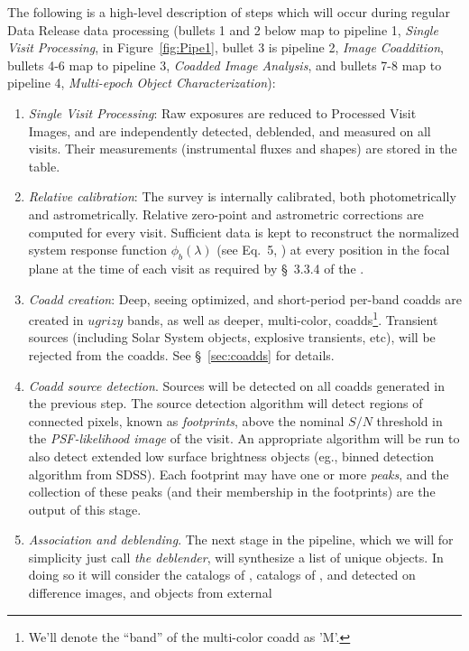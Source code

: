 The following is a high-level description of steps which will occur during regular Data Release data processing
(bullets 1 and 2 below map to pipeline 1, \emph{Single Visit Processing}, in Figure~\ref{fig:Pipe1}, bullet 3 is
pipeline 2, \emph{Image Coaddition}, bullets 4-6 map to pipeline 3, \emph{Coadded Image Analysis}, and
bullets 7-8 map to pipeline 4, \emph{Multi-epoch Object Characterization}):
\begin{enumerate}
    \item \emph{Single Visit Processing}: Raw exposures are reduced to Processed Visit Images, and \Sources are independently detected, deblended, and measured on all visits. Their measurements (instrumental fluxes and shapes) are stored in the \Source table.
    \item \emph{Relative calibration}: The survey is internally calibrated, both photometrically and astrometrically. Relative zero-point and astrometric corrections are computed for every visit.  Sufficient data is kept to reconstruct the normalized system response function $\phi_b(\lambda)$ (see Eq.~5, \SRD) at every position in the focal plane at the time of each visit as required by \S~3.3.4 of the \SRD.
    \item \emph{Coadd creation}: Deep, seeing optimized,  and short-period per-band coadds are created in $ugrizy$ bands, as well as deeper, multi-color,  coadds\footnote{We'll denote the ``band'' of the multi-color coadd as 'M'.}. Transient sources (including Solar System objects, explosive transients, etc), will be rejected from the coadds. See \S~\ref{sec:coadds} for details.
    \item \emph{Coadd source detection}. Sources will be detected on all coadds generated in the previous step. The source detection algorithm will detect regions of connected pixels, known as \emph{footprints}, above the nominal $S/N$ threshold in the \emph{PSF-likelihood image} of the visit. An appropriate algorithm will be run to also detect extended low surface brightness objects
(eg., binned detection algorithm from SDSS).  Each footprint may have one or more \emph{peaks}, and the collection of these peaks (and their membership in the footprints) are the output of this stage.
    \item \emph{Association and deblending}.  The next stage in the pipeline, which we will for simplicity just call \emph{the deblender}, will synthesize a list of unique objects. In doing so it will consider the catalogs of \CoaddSources, catalogs of \DIASources, \DIAObjects and \SSObjects detected on difference images, and objects from external

\end{enumerate}
